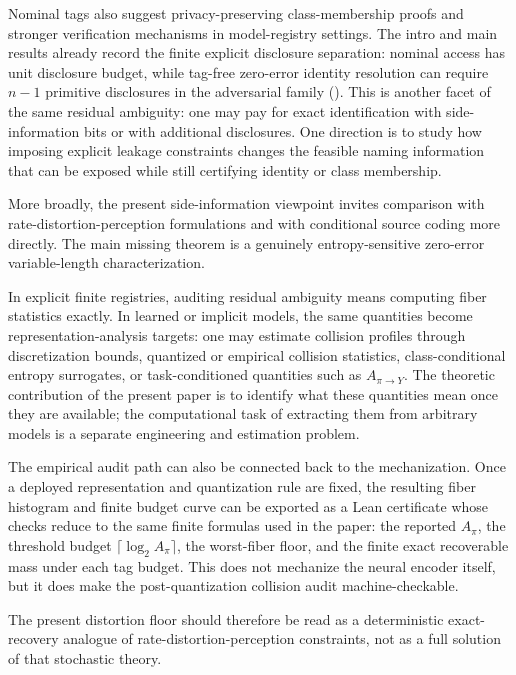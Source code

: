Nominal tags also suggest privacy-preserving class-membership proofs and stronger verification mechanisms in model-registry settings. The intro and main results already record the finite explicit disclosure separation: nominal access has unit disclosure budget, while tag-free zero-error identity resolution can require $n-1$ primitive disclosures in the adversarial family (). This is another facet of the same residual ambiguity: one may pay for exact identification with side-information bits or with additional disclosures. One direction is to study how imposing explicit leakage constraints changes the feasible naming information that can be exposed while still certifying identity or class membership.

More broadly, the present side-information viewpoint invites comparison with rate-distortion-perception formulations \cite{blau2019rethinking} and with conditional source coding more directly. The main missing theorem is a genuinely entropy-sensitive zero-error variable-length characterization.

In explicit finite registries, auditing residual ambiguity means computing fiber statistics exactly. In learned or implicit models, the same quantities become representation-analysis targets: one may estimate collision profiles through discretization bounds, quantized or empirical collision statistics, class-conditional entropy surrogates, or task-conditioned quantities such as $A_{\pi \to Y}$. The theoretic contribution of the present paper is to identify what these quantities mean once they are available; the computational task of extracting them from arbitrary models is a separate engineering and estimation problem.

The empirical audit path can also be connected back to the mechanization. Once a deployed representation and quantization rule are fixed, the resulting fiber histogram and finite budget curve can be exported as a Lean certificate whose checks reduce to the same finite formulas used in the paper: the reported $A_\pi$, the threshold budget $\lceil \log_2 A_\pi \rceil$, the worst-fiber floor, and the finite exact recoverable mass under each tag budget. This does not mechanize the neural encoder itself, but it does make the post-quantization collision audit machine-checkable.

The present distortion floor should therefore be read as a deterministic exact-recovery analogue of rate-distortion-perception constraints, not as a full solution of that stochastic theory.

